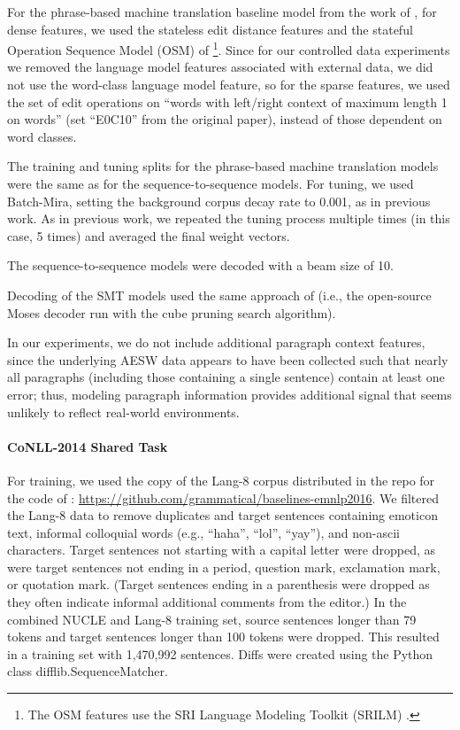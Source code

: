 \documentclass[11pt,letterpaper]{article}
\begin{document}
For the phrase-based machine translation baseline model from the work of , for dense features, we used the stateless edit distance features and the stateful Operation Sequence Model (OSM) of \footnote{The OSM features use the SRI Language Modeling Toolkit (SRILM) \cite{Stolcke02srilm}. 

}. Since for our controlled data experiments we removed the language model features associated with external data, we did not use the word-class language model feature, so for the sparse features, we used the set of edit operations on ``words with left/right context of maximum length 1 on words'' (set ``E0C10'' from the original paper), instead of those dependent on word classes.

The training and tuning splits for the phrase-based machine translation models were the same as for the sequence-to-sequence models. For tuning, we used Batch-Mira, setting the background corpus decay rate to 0.001, as in previous work. As in previous work, we repeated the tuning process multiple times (in this case, 5 times) and averaged the final weight vectors.

The sequence-to-sequence models were decoded with a beam size of 10. 

Decoding of the \textsc{SMT} models used the same approach of  (i.e., the open-source Moses decoder run with the cube pruning search algorithm).

In our experiments, we do not include additional paragraph context features, since the underlying AESW data appears to have been collected such that nearly all paragraphs (including those containing a single sentence) contain at least one error; thus, modeling paragraph information provides additional signal that seems unlikely to reflect real-world environments.

\paragraph{CoNLL-2014 Shared Task}
For training, we used the copy of the Lang-8 corpus distributed in the repo for the code of : \url{https://github.com/grammatical/baselines-emnlp2016}. We filtered the Lang-8 data to remove duplicates and target sentences containing emoticon text, informal colloquial words (e.g., ``haha'', ``lol'', ``yay''), and non-ascii characters. Target sentences not starting with a capital letter were dropped, as were target sentences not ending in a period, question mark, exclamation mark, or quotation mark. (Target sentences ending in a parenthesis were dropped as they often indicate informal additional comments from the editor.) In the combined NUCLE and Lang-8 training set, source sentences longer than 79 tokens and target sentences longer than 100 tokens were dropped. This resulted in a training set with 1,470,992 sentences. Diffs were created using the Python class difflib.SequenceMatcher.
\end{document}
